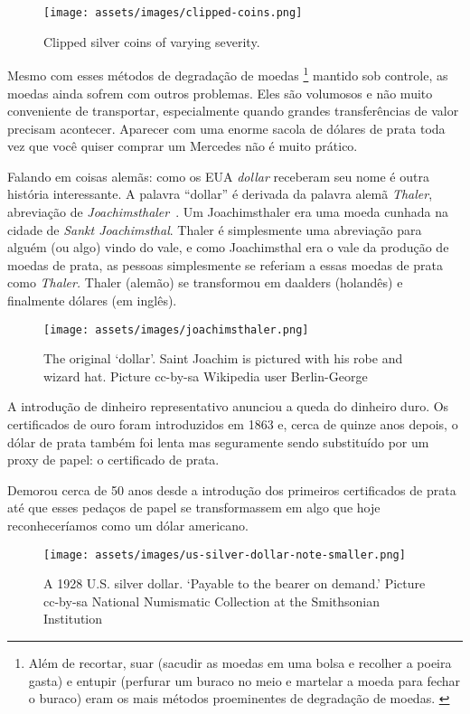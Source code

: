 \begin{figure}
  \texttt{[image: assets/images/clipped-coins.png]}
  \caption{Clipped silver coins of varying severity.}
  \label{fig:clipped-coins}
\end{figure}

Mesmo com esses métodos de degradação de moedas \footnote{Além de recortar, suar (sacudir as 
moedas em uma bolsa e recolher a poeira gasta) e entupir (perfurar um buraco no meio e martelar 
a moeda para fechar o buraco) eram os mais métodos proeminentes de degradação de moedas. 
\cite{wiki: coin-degradation}} mantido sob controle, as moedas ainda sofrem com outros problemas. 
Eles são volumosos e não muito conveniente de transportar, especialmente quando grandes 
transferências de valor precisam acontecer. Aparecer com uma enorme sacola de dólares de prata 
toda vez que você quiser comprar um Mercedes não é muito prático.

Falando em coisas alemãs: como os EUA \textit{dollar} receberam seu nome é outra história 
interessante. A palavra \enquote{dollar} é derivada da palavra alemã \textit{Thaler}, abreviação 
de \textit{Joachimsthaler}~\cite{wiki: thaler}. Um Joachimsthaler era uma moeda cunhada na 
cidade de \textit{Sankt Joachimsthal}. Thaler é simplesmente uma abreviação para alguém (ou algo)
vindo do vale, e como Joachimsthal era o vale da produção de moedas de prata, as pessoas 
simplesmente se referiam a essas moedas de prata como \textit{Thaler.} Thaler (alemão) se transformou 
em daalders (holandês) e finalmente dólares (em inglês).


\begin{figure}
  \centering
  \texttt{[image: assets/images/joachimsthaler.png]}
  \caption{The original `dollar'. Saint Joachim is pictured with his robe and wizard hat. Picture cc-by-sa Wikipedia user Berlin-George}
  \label{fig:joachimsthaler}
\end{figure}

A introdução de dinheiro representativo anunciou a queda do dinheiro duro. Os certificados 
de ouro foram introduzidos em 1863 e, cerca de quinze anos depois, o dólar de prata também 
foi lenta mas seguramente sendo substituído por um proxy de papel: o certificado de prata. 
\cite{wiki: certificado de prata}

Demorou cerca de 50 anos desde a introdução dos primeiros certificados de prata até que 
esses pedaços de papel se transformassem em algo que hoje reconheceríamos como um dólar 
americano.

\begin{figure}
  \centering
  \texttt{[image: assets/images/us-silver-dollar-note-smaller.png]}
  \caption{A 1928 U.S. silver dollar. `Payable to the bearer on demand.' Picture cc-by-sa National Numismatic Collection at the Smithsonian Institution}
  \label{fig:us-silver-dollar-note-smaller}
\end{figure}

